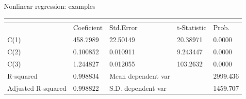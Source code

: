 \documentclass{beamer}
\begin{document}
\begin{frame}{Nonlinear regression: examples}
\begin{table}[]
\begin{tabular}{@{}lllll@{}}
\multicolumn{5}{l}{}                                                                                                                                                                                                                                                                                                                       \\ \midrule
                                                                      & Coeficient                                                    & Std.Error                                                             & t-Statistic                                                   & Prob.                                                      \\ \midrule
C(1)                                                                  & 458.7989                                                      & 22.50149                                                              & 20.38971                                                      & 0.0000                                                     \\
C(2)                                                                  & 0.100852                                                      & 0.010911                                                              & 9.243447                                                      & 0.0000                                                     \\
C(3)                                                                  & 1.244827                                                      & 0.012055                                                              & 103.2632                                                      & 0.0000                                                     \\ \midrule
R-squared                                                             & 0.998834                                                      & Mean dependent var                                                    &                                                               & 2999.436                                                   \\
Adjusted R-squared                                                    & 0.998822                                                      & \multicolumn{2}{l}{S.D. dependent var}                                                                                                & 1459.707                                                   \\

\end{tabular}
\end{table}
\end{frame}
\end{document}
